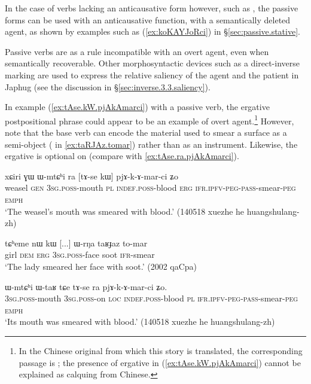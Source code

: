 In the case of verbs lacking an anticausative form however, such as  , the passive forms can be used with an anticausative function, with a semantically deleted agent, as shown by examples such as (\ref{ex:koKAYJoRci}) in §\ref{sec:passive.stative}.

Passive verbs are as a rule incompatible with an overt agent, even when semantically recoverable. Other morphosyntactic devices such as a direct-inverse marking are used to express the relative saliency of the agent and the patient in Japhug (see the discussion in §\ref{sec:inverse.3.3.saliency}).


In example (\ref{ex:tAse.kW.pjAkAmarci}) with a passive verb, the ergative postpositional phrase  could appear to be an example of overt agent.\footnote{In the Chinese original from which this story is translated, the corresponding passage is ; the presence of ergative in (\ref{ex:tAse.kW.pjAkAmarci}) cannot be explained as calquing from Chinese. } However, note that the base verb  can encode the material used to smear a surface as a semi-object ( in \ref{ex:taRJAz.tomar}) rather than as an instrument. Likewise, the ergative is optional on  (compare with \ref{ex:tAse.ra.pjAkAmarci}).

\begin{exe}
\ex \label{ex:tAse.kW.pjAkAmarci}
 \gll xɕiri ɣɯ ɯ-mtɕʰi ra [tɤ-se kɯ] pjɤ-k-ɤ-mar-ci ʑo \\
 weasel \textsc{gen} \textsc{3sg}.\textsc{poss}-mouth \textsc{pl} \textsc{indef}.\textsc{poss}-blood \textsc{erg} \textsc{ifr}.\textsc{ipfv}-\textsc{peg}-\textsc{pass}-smear-\textsc{peg} \textsc{emph} \\
\glt  `The weasel's mouth was smeared with blood.' (140518 xuezhe he huangshulang-zh)
\end{exe}

\begin{exe}
\ex \label{ex:taRJAz.tomar}
 \gll tɕʰeme nɯ kɯ  [...] ɯ-rŋa taʁɟaz to-mar \\
 girl \textsc{dem} \textsc{erg} { } \textsc{3sg}.\textsc{poss}-face soot \textsc{ifr}-smear \\
 \glt `The lady smeared her face with soot.' (2002 qaCpa)
\end{exe}

\begin{exe}
\ex \label{ex:tAse.ra.pjAkAmarci}
 \gll  ɯ-mtɕʰi ɯ-taʁ tɕe tɤ-se ra pjɤ-k-ɤ-mar-ci ʑo. \\
 \textsc{3sg}.\textsc{poss}-mouth \textsc{3sg}.\textsc{poss}-on \textsc{loc} \textsc{indef}.\textsc{poss}-blood \textsc{pl} \textsc{ifr}.\textsc{ipfv}-\textsc{peg}-\textsc{pass}-smear-\textsc{peg} \textsc{emph} \\
\glt  `Its mouth was smeared with blood.' (140518 xuezhe he huangshulang-zh) 
\end{exe}


